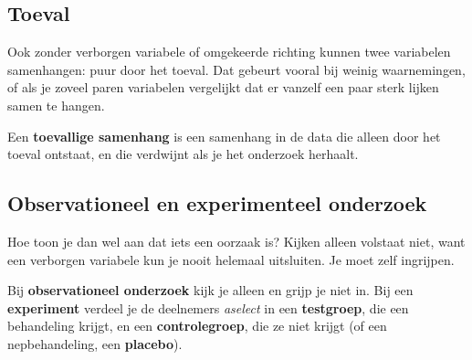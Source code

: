 \begin{oefeningen}
\end{oefeningen}

\subsection{Toeval}

Ook zonder verborgen variabele of omgekeerde richting kunnen twee variabelen samenhangen: puur door het toeval. Dat gebeurt vooral bij weinig waarnemingen, of als je zoveel paren variabelen vergelijkt dat er vanzelf een paar sterk lijken samen te hangen.

\begin{theorie}
Een \textbf{\textcolor{accent}{toevallige samenhang}} is een samenhang in de data die alleen door het toeval ontstaat, en die verdwijnt als je het onderzoek herhaalt.
\end{theorie}


\begin{oefeningen}
\end{oefeningen}

\subsection{Observationeel en experimenteel onderzoek}

Hoe toon je dan wel aan dat iets een oorzaak is? Kijken alleen volstaat niet, want een verborgen variabele kun je nooit helemaal uitsluiten. Je moet zelf ingrijpen.

\begin{theorie}
Bij \textbf{\textcolor{accent}{observationeel onderzoek}} kijk je alleen en grijp je niet in. Bij een \textbf{\textcolor{accent}{experiment}} verdeel je de deelnemers \textit{aselect} in een \textbf{\textcolor{accent}{testgroep}}, die een behandeling krijgt, en een \textbf{\textcolor{accent}{controlegroep}}, die ze niet krijgt (of een nepbehandeling, een \textbf{\textcolor{accent}{placebo}}).
\end{theorie}

